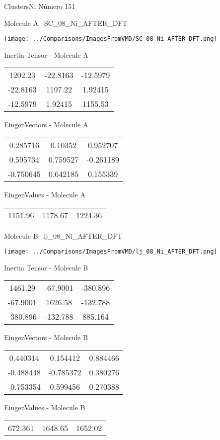 \vtab[-3cm]
\begin{center}
{\large ClustersNi \tab Número 151}
\end{center}
\begin{multicols}{2}
\begin{center}

Molecule A \
SC\_08\_Ni\_AFTER\_DFT

\texttt{[image: ../Comparisons/ImagesFromVMD/SC\_08\_Ni\_AFTER\_DFT.png]}

Inertia Tensor - Molecule A \\
\begin{tabular}{|c c c|}
1202.23	 & 	-22.8163	 & 	-12.5979	 \\
-22.8163	 & 	1197.22	 & 	1.92415	 \\
-12.5979	 & 	1.92415	 & 	1155.53
\end{tabular}

\vtab
 EingenVectors - Molecule A     \\
\begin{tabular}{|c c c|}
0.285716	 & 	0.10352	 & 	0.952707	 \\
0.595734	 & 	0.759527	 & 	-0.261189	 \\
-0.750645	 & 	0.642185	 & 	0.155339
\end{tabular}

\vtab
 EingenValues - Molecule A     \\
\begin{tabular}{|c c c|}
1151.96	 & 	1178.67	 & 	1224.36	 \\
\end{tabular}
\columnbreak

Molecule B \
lj\_08\_Ni\_AFTER\_DFT

\texttt{[image: ../Comparisons/ImagesFromVMD/lj\_08\_Ni\_AFTER\_DFT.png]}

Inertia Tensor - Molecule B \\
\begin{tabular}{|c c c|}
1461.29	 & 	-67.9001	 & 	-380.896	 \\
-67.9001	 & 	1626.58	 & 	-132.788	 \\
-380.896	 & 	-132.788	 & 	885.164
\end{tabular}

\vtab
 EingenVectors - Molecule B     \\
\begin{tabular}{|c c c|}
0.440314	 & 	0.154412	 & 	0.884466	 \\
-0.488448	 & 	-0.785372	 & 	0.380276	 \\
-0.753354	 & 	0.599456	 & 	0.270388
\end{tabular}

\vtab
 EingenValues - Molecule B     \\
\begin{tabular}{|c c c|}
672.361	 & 	1648.65	 & 	1652.02	 \\
\end{tabular}

\end{center}
\end{multicols}

